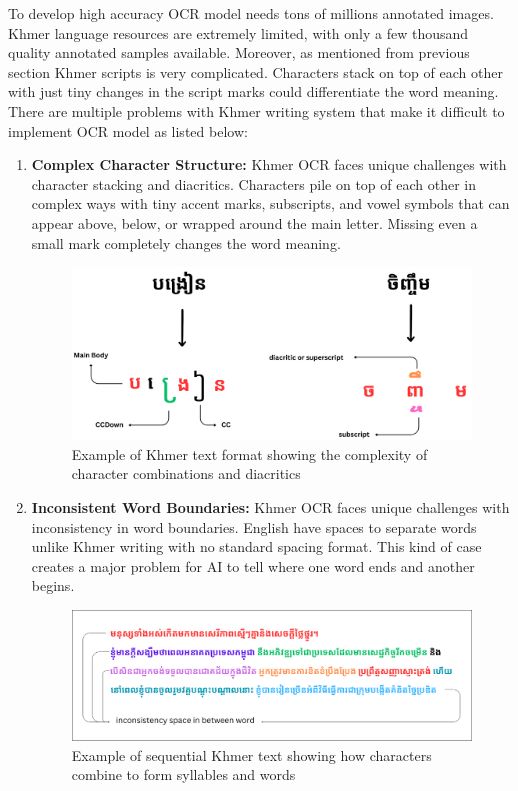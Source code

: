 To develop high accuracy OCR model needs tons of millions 
annotated images. Khmer language resources are extremely 
limited, with only a few thousand quality annotated samples 
available. Moreover, as mentioned from previous section 
Khmer scripts is very complicated. Characters stack on 
top of each other with just tiny changes in the script 
marks could differentiate the word meaning. There are 
multiple problems with Khmer writing system that make it 
difficult to implement OCR model as listed below:

\begin{enumerate}
    \item \textbf{Complex Character Structure:} Khmer OCR faces unique challenges with character stacking and diacritics. Characters pile on top of each other in complex ways with tiny accent marks, subscripts, and vowel symbols that can appear above, below, or wrapped around the main letter. Missing even a small mark completely changes the word meaning.
    
        \begin{figure}[H]
            \centering
            \includegraphics[width=\textwidth]{figures/example_of_text_format.png}
            \caption{Example of Khmer text format showing the complexity of character combinations and diacritics}
            \label{fig:text_format}
        \end{figure}

    \item \textbf{Inconsistent Word Boundaries:} Khmer OCR faces unique challenges with inconsistency in word boundaries. English have spaces to separate words unlike Khmer writing with no standard spacing format. This kind of case creates a major problem for AI to tell where one word ends and another begins.
    
        \begin{figure}[H]
            \centering
            \includegraphics[width=\textwidth]{figures/example_of_long_text.png}
            \caption{Example of sequential Khmer text showing how characters combine to form syllables and words}
            \label{fig:sequential_text}
        \end{figure}


\end{enumerate}
